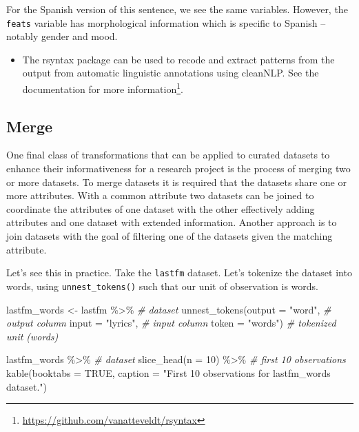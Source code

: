 \documentclass[
]{article}
\newenvironment{Shaded}{\begin{snugshade}}{\end{snugshade}}
\newcommand{\AttributeTok}[1]{\textcolor[rgb]{0.77,0.63,0.00}{#1}}
\newcommand{\CommentTok}[1]{\textcolor[rgb]{0.56,0.35,0.01}{\textit{#1}}}
\newcommand{\ConstantTok}[1]{\textcolor[rgb]{0.00,0.00,0.00}{#1}}
\newcommand{\DecValTok}[1]{\textcolor[rgb]{0.00,0.00,0.81}{#1}}
\newcommand{\FunctionTok}[1]{\textcolor[rgb]{0.00,0.00,0.00}{#1}}
\newcommand{\NormalTok}[1]{#1}
\newcommand{\OtherTok}[1]{\textcolor[rgb]{0.56,0.35,0.01}{#1}}
\newcommand{\SpecialCharTok}[1]{\textcolor[rgb]{0.00,0.00,0.00}{#1}}
\newcommand{\StringTok}[1]{\textcolor[rgb]{0.31,0.60,0.02}{#1}}
\DeclareRobustCommand{\href}[2]{#2\footnote{\url{#1}}}
\newenvironment{rmdblock}[1]
  {\begin{shaded*}
  \begin{itemize}
  \renewcommand{\labelitemi}{
    \raisebox{-.5\height}[0pt][0pt]{
      {\setkeys{Gin}{width=2em,keepaspectratio}\texttt{[image: assets/images/\#1]}}
    }
  }
  \item
  }
  {
  \end{itemize}
  \end{shaded*}
  }
\newenvironment{rmdtip}
  {\begin{rmdblock}{tip}}
  {\end{rmdblock}}
\begin{document}
For the Spanish version of this sentence, we see the same variables. However, the \texttt{feats} variable has morphological information which is specific to Spanish --notably gender and mood.

\begin{rmdtip}
The rsyntax package \citep{R-rsyntax} can be used to recode and extract patterns from the output from automatic linguistic annotations using cleanNLP. \href{https://github.com/vanatteveldt/rsyntax}{See the documentation for more information}.
\end{rmdtip}

\hypertarget{merge}{%
\subsection{Merge}\label{merge}}

One final class of transformations that can be applied to curated datasets to enhance their informativeness for a research project is the process of merging two or more datasets. To merge datasets it is required that the datasets share one or more attributes. With a common attribute two datasets can be joined to coordinate the attributes of one dataset with the other effectively adding attributes and one dataset with extended information. Another approach is to join datasets with the goal of filtering one of the datasets given the matching attribute.

Let's see this in practice. Take the \texttt{lastfm} dataset. Let's tokenize the dataset into words, using \texttt{unnest\_tokens()} such that our unit of observation is words.

\begin{Shaded}
\begin{Highlighting}[]
\NormalTok{lastfm\_words }\OtherTok{\textless{}{-}} 
\NormalTok{  lastfm }\SpecialCharTok{\%\textgreater{}\%} \CommentTok{\# dataset}
  \FunctionTok{unnest\_tokens}\NormalTok{(}\AttributeTok{output =} \StringTok{"word"}\NormalTok{, }\CommentTok{\# output column}
                \AttributeTok{input =} \StringTok{"lyrics"}\NormalTok{, }\CommentTok{\# input column}
                \AttributeTok{token =} \StringTok{"words"}\NormalTok{) }\CommentTok{\# tokenized unit (words)}

\NormalTok{lastfm\_words }\SpecialCharTok{\%\textgreater{}\%} \CommentTok{\# dataset}
  \FunctionTok{slice\_head}\NormalTok{(}\AttributeTok{n =} \DecValTok{10}\NormalTok{) }\SpecialCharTok{\%\textgreater{}\%} \CommentTok{\# first 10 observations}
  \FunctionTok{kable}\NormalTok{(}\AttributeTok{booktabs =} \ConstantTok{TRUE}\NormalTok{,}
        \AttributeTok{caption =} \StringTok{"First 10 observations for \textasciigrave{}lastfm\_words\textasciigrave{} dataset."}\NormalTok{)}
\end{Highlighting}
\end{Shaded}
\end{document}
